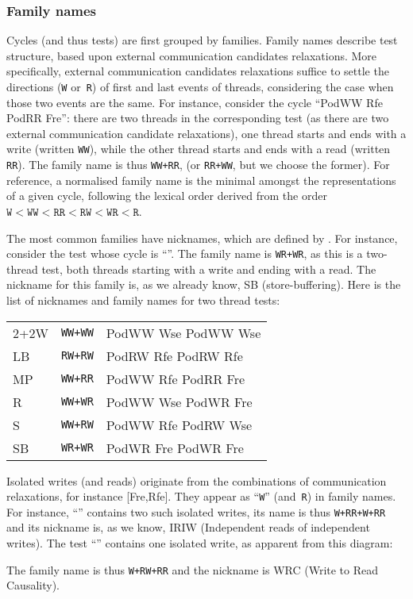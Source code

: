 \subsubsection{Family names}
Cycles (and thus tests) are first grouped by families.
Family names describe test structure,
based upon external communication candidates relaxations.
More specifically, external communication candidates relaxations
suffice to settle the directions (\texttt{W} or~\texttt{R}) of
first and last events of threads,
considering the case when those two events are the same.
For instance, consider the cycle ``PodWW Rfe PodRR Fre'':
there are two threads
in the corresponding test (as there are two external communication candidate
relaxations), one thread starts and ends with a write (written \texttt{WW}),
while the other thread starts and ends with a read (written \texttt{RR}).
The family name is thus
\texttt{WW+RR}, (or \texttt{RR+WW}, but we choose the former).
For reference, a normalised family name is the minimal
amongst the representations of a given cycle, following the lexical order
derived from the order
$\texttt{W} < \texttt{WW} <
\texttt{RR} < \texttt{RW} < \texttt{WR} < \texttt{R}$.

The most common families have nicknames, which are defined
by .
For instance, consider the test whose cycle is
``''.
The family name is \texttt{WR+WR}, as
this is a two-thread test, both threads starting with
a write and ending with a read.
The nickname for this family is, as we already know, SB (store-buffering).
Here is the list of nicknames and family names for two thread tests:
\begin{center}
\begin{tabular}{ll|l}
\hline
2+2W & \texttt{WW+WW} & PodWW Wse PodWW Wse \\
LB  & \texttt{RW+RW} & PodRW Rfe PodRW Rfe \\
MP & \texttt{WW+RR} & PodWW Rfe PodRR Fre \\
R & \texttt{WW+WR} & PodWW Wse PodWR Fre \\
S & \texttt{WW+RW} & PodWW Rfe PodRW Wse \\
SB & \texttt{WR+WR} & PodWR Fre PodWR Fre \\
\hline
\end{tabular}
\end{center}

Isolated writes (and reads) originate from the combinations of
communication relaxations,
for instance [Fre,Rfe].
They appear as ``\texttt{W}'' (and~\texttt{R}) in family names.
For instance,  ``''
contains two such isolated
writes, its name is thus \texttt{W+RR+W+RR} and its nickname is,
as we know, IRIW (Independent reads of independent writes).
The test ``''
contains one isolated write, as apparent from
this diagram:
\begin{center}\end{center}
The family name is thus \texttt{W+RW+RR} and the nickname is
WRC (Write to Read Causality).

